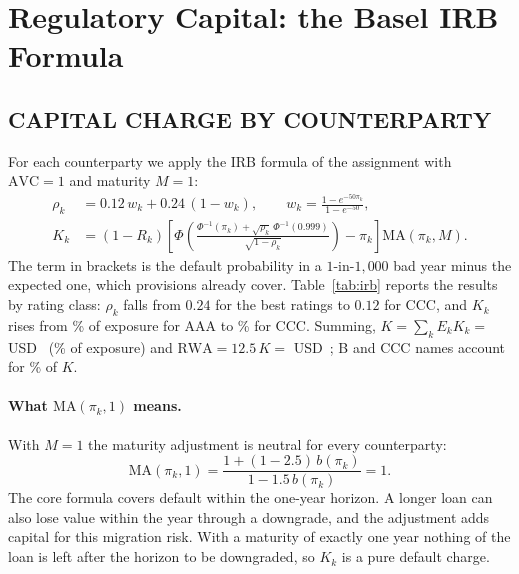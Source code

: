 \section{Regulatory Capital: the Basel IRB Formula}
\label{sec:irb}


\subsection{CAPITAL CHARGE BY COUNTERPARTY}
For each counterparty we apply the IRB formula of the assignment \citep{BCBS05} with $\mathrm{AVC}=1$ and maturity $M=1$:
\begin{align*}
\rho_k&=0.12\,w_k+0.24\,(1-w_k),\qquad w_k=\frac{1-e^{-50\pi_k}}{1-e^{-50}},\\
K_k&=(1-R_k)\left[\Phi\!\left(\frac{\Phi^{-1}(\pi_k)+\sqrt{\rho_k}\,\Phi^{-1}(0.999)}{\sqrt{1-\rho_k}}\right)-\pi_k\right]\mathrm{MA}(\pi_k,M).
\end{align*}
The term in brackets is the default probability in a $1$-in-$1{,}000$ bad year minus the expected one, which provisions already cover. Table~\ref{tab:irb} reports the results by rating class: $\rho_k$ falls from $0.24$ for the best ratings to $0.12$ for CCC, and $K_k$ rises from \% of exposure for AAA to \% for CCC. Summing, $K=\sum_kE_kK_k=$ USD~ (\% of exposure) and $\mathrm{RWA}=12.5\,K=$ USD~; B and CCC names account for \% of $K$.

\begin{table}[tb]
\caption{Basel IRB quantities by rating class ($\mathrm{AVC}=1$, $M=1$). $\bar K_k$, $\overline{\mathrm{LGD}}$: averages within the class; amounts in USD. Last column: average market share of risk $\lambda_k$ in our model.}
\label{tab:irb}
\centering
{}
\end{table}

\paragraph{What $\mathrm{MA}(\pi_k,1)$ means.}
With $M=1$ the maturity adjustment is neutral for every counterparty:
\[
\mathrm{MA}(\pi_k,1)=\frac{1+(1-2.5)\,b(\pi_k)}{1-1.5\,b(\pi_k)}=1 .
\]
The core formula covers default within the one-year horizon. A longer loan can also lose value within the year through a downgrade, and the adjustment adds capital for this migration risk. With a maturity of exactly one year nothing of the loan is left after the horizon to be downgraded, so $K_k$ is a pure default charge.


